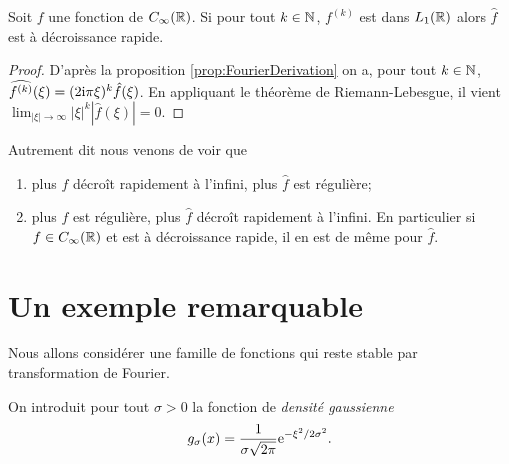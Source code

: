 \begin{proposition}
\label{prop:1914}
Soit $f$ une fonction de $C_\infty(\mathbb{R})$. Si pour tout $k \in \mathbb{N}$, $f^{(k)}$ est dans $L_1(\mathbb{R})$
alors $\hat{f}$ est {\`a} d{\'e}croissance rapide.
\end{proposition}
\begin{proof}
D'apr{\`e}s la proposition \ref{prop:FourierDerivation} on a, pour tout $k \in \mathbb{N}$,
$\widehat{f^{(k)}}(\xi) = (2 \mathrm{i} \pi \xi)^k \hat{f}(\xi)$.
En appliquant le th{\'e}or{\`e}me de Riemann-Lebesgue,  il vient $\lim_{|\xi| \to \infty} |\xi|^k |\hat{f}(\xi)| = 0$.
\end{proof}
Autrement dit nous venons de voir que
\begin{enumerate}
\item plus $f$ d{\'e}cro{\^i}t rapidement {\`a} l'infini, plus $\hat{f}$ est r{\'e}guli{\`e}re;
\item plus $f$ est r{\'e}guli{\`e}re, plus $\hat{f}$ d{\'e}cro{\^i}t rapidement {\`a} l'infini.
En particulier si $f \in C_\infty(\mathbb{R})$ et est {\`a} d{\'e}croissance rapide, il en est de m{\^e}me pour
$\hat{f}$.
\end{enumerate}

\section{Un exemple remarquable}

Nous allons consid{\'e}rer une famille de fonctions  qui reste stable par transformation de Fourier.

On introduit pour tout $\sigma > 0$ la fonction de \emph{densit{\'e} gaussienne}
\begin{equation}
  \label{eq:gauss_func}
  g_\sigma(x)=\frac{1}{\sigma \sqrt{2 \pi} }\mathrm{e}^{- \xi^2/2 \sigma^2}.
\end{equation}


